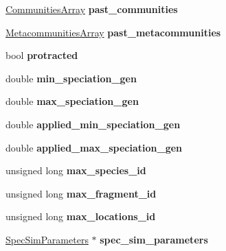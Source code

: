 \begin{DoxyCompactItemize}
\item 
\hyperlink{struct_communities_array}{Communities\+Array} {\bfseries past\+\_\+communities}\hypertarget{group___community_objects_a0726a962287af565658aaa8f9d9ea6c1}{}\label{group___community_objects_a0726a962287af565658aaa8f9d9ea6c1}

\item 
\hyperlink{struct_metacommunities_array}{Metacommunities\+Array} {\bfseries past\+\_\+metacommunities}\hypertarget{group___community_objects_ae00d8d9f52d163b040cc716955569ad3}{}\label{group___community_objects_ae00d8d9f52d163b040cc716955569ad3}

\item 
bool {\bfseries protracted}\hypertarget{group___community_objects_acab5a676e365934f9dfd2148ab9d5a60}{}\label{group___community_objects_acab5a676e365934f9dfd2148ab9d5a60}

\item 
double {\bfseries min\+\_\+speciation\+\_\+gen}\hypertarget{group___community_objects_a6b906ec2096b22631b60aa3511925fe0}{}\label{group___community_objects_a6b906ec2096b22631b60aa3511925fe0}

\item 
double {\bfseries max\+\_\+speciation\+\_\+gen}\hypertarget{group___community_objects_aeff6623b51fdd177e87b6eebfba27080}{}\label{group___community_objects_aeff6623b51fdd177e87b6eebfba27080}

\item 
double {\bfseries applied\+\_\+min\+\_\+speciation\+\_\+gen}\hypertarget{group___community_objects_aa5e9946a354a46d675e015d803cc7fa1}{}\label{group___community_objects_aa5e9946a354a46d675e015d803cc7fa1}

\item 
double {\bfseries applied\+\_\+max\+\_\+speciation\+\_\+gen}\hypertarget{group___community_objects_a77d20815b5638387ce186130657ec660}{}\label{group___community_objects_a77d20815b5638387ce186130657ec660}

\item 
unsigned long {\bfseries max\+\_\+species\+\_\+id}\hypertarget{group___community_objects_a31f80e452a92aabdf2d9ba7bcc798f84}{}\label{group___community_objects_a31f80e452a92aabdf2d9ba7bcc798f84}

\item 
unsigned long {\bfseries max\+\_\+fragment\+\_\+id}\hypertarget{group___community_objects_a5de3afc536570241b82489d1b9c87d03}{}\label{group___community_objects_a5de3afc536570241b82489d1b9c87d03}

\item 
unsigned long {\bfseries max\+\_\+locations\+\_\+id}\hypertarget{group___community_objects_ae503af91bc33ed302a363098a3b49a61}{}\label{group___community_objects_ae503af91bc33ed302a363098a3b49a61}

\item 
\hyperlink{struct_spec_sim_parameters}{Spec\+Sim\+Parameters} $\ast$ {\bfseries spec\+\_\+sim\+\_\+parameters}\hypertarget{group___community_objects_a45df8aefb9914e7c8f3133143069ca35}{}\label{group___community_objects_a45df8aefb9914e7c8f3133143069ca35}

\end{DoxyCompactItemize}


